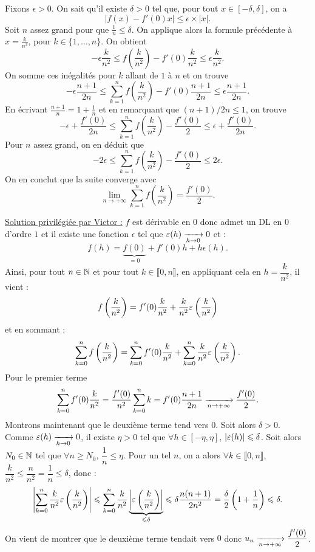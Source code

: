 \documentclass{magnolia}
\begin{document}
\begin{sol}
Fixons $\epsilon>0$. On sait qu'il existe $\delta>0$ tel que, pour tout $x\in[-\delta,\delta]$, on a
$$|f(x)-f'(0)x|\leq \epsilon\times |x|.$$
Soit $n$ assez grand pour que $\frac{1}{n}\leq \delta$. On applique
alors la formule précédente à $x=\frac k{n^2}$, pour $k\in\{1,\dots,n\}$. On obtient
$$-\epsilon\frac k{n^2}\leq f\left(\frac k{n^2}\right)-f'(0)\frac{k}{n^2}\leq \epsilon\frac k{n^2}.$$
On somme ces inégalités pour $k$ allant de $1$ à $n$ et on trouve
$$-\epsilon\frac{n+1}{2n}\leq \sum_{k=1}^n f\left(\frac k{n^2}\right)-f'(0)\frac{n+1}{2n}\leq \epsilon\frac{n+1}{2n}.$$
En écrivant $\frac{n+1}{n}=1+\frac{1}{n}$ et en remarquant que $(n+1)/2n\leq 1$, on trouve
$$-\epsilon+\frac{f'(0)}{2n}\leq \sum_{k=1}^n f\left(\frac k{n^2}\right)-\frac{f'(0)}2\leq \epsilon+\frac{f'(0)}{2n}.$$
Pour $n$ assez grand, on en déduit que 
$$-2\epsilon\leq \sum_{k=1}^n f\left(\frac k{n^2}\right)-\frac{f'(0)}2\leq 2\epsilon.$$
On en conclut que la suite converge avec $$\lim_{n\to+\infty}\sum_{k=1}^n f\left(\frac k{n^2}\right)=\frac{f'(0)}{2}.$$

\underline{Solution privilégiée par Victor :}
$f$ est dérivable en $0$ donc admet un DL en $0$ d'ordre $1$ et il existe une fonction $\epsilon$ tel que $\varepsilon(h)\xrightarrow[h\rightarrow 0]{}0$ et :
$$f(h)=\underbrace{f(0)}_{=0}+f'(0)h+h\epsilon(h).$$
Ainsi, pour tout $n\in \mathbb{N}$ et pour tout $k\in \llbracket0,n\rrbracket$, en appliquant cela en $h=\dfrac{k}{n^2}$, il vient :
$$f\left(\frac{k}{n^2}\right)=f'(0)\frac{k}{n^2}+\frac{k}{n^2}\varepsilon\left(\frac{k}{n^2}\right)$$ et en sommant :
$$\sum_{k=0}^nf\left(\frac{k}{n^2}\right)=\sum_{k=0}^nf'(0)\frac{k}{n^2}+\sum_{k=0}^n\frac{k}{n^2}\varepsilon\left(\frac{k}{n^2}\right).$$
Pour le premier terme 
$$\sum_{k=0}^nf'(0)\frac{k}{n^2}=\frac{f'(0)}{n^2}\sum_{k=0}^n k=f'(0) \frac{n+1}{2n}\xrightarrow[n\rightarrow +\infty]{}\frac{f'(0)}{2}.$$
Montrons maintenant que le deuxième terme tend vers $0$. Soit alors $\delta>0$. Comme $\varepsilon(h)\xrightarrow[h\rightarrow 0]{}0$, il existe $\eta>0$ tel que $\forall h \in [-\eta,\eta]$, $\left|\varepsilon(h)\right|\leqslant \delta$. Soit alors $N_0 \in \mathbb{N}$ tel que $\forall n\geq N_0$, $\dfrac{1}{n}\leq \eta$. Pour un tel $n$, on a alors $\forall k\in \llbracket 0, n\rrbracket$, $\dfrac{k}{n^2}\leq \dfrac{n}{n^2}=\dfrac{1}{n}\leq \delta$, donc :
$$\left|\sum_{k=0}^n\frac{k}{n^2}\varepsilon\left(\frac{k}{n^2}\right)\right|\leqslant \sum_{k=0}^n\frac{k}{n^2}\underbrace{\left|\varepsilon\left(\frac{k}{n^2}\right)\right|}_{\leqslant \delta}\leqslant \delta \frac{n(n+1)}{2n^2}=\frac{\delta}{2}\left(1+\frac{1}{n}\right)\leqslant \delta.$$
On vient de montrer que le deuxième terme tendait vers $0$ donc $u_n\xrightarrow[n\rightarrow +\infty]{}\dfrac{f'(0)}{2}$.
 
\end{sol}
\end{document}
